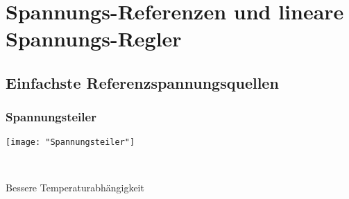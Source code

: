 \section{Spannungs-Referenzen und lineare Spannungs-Regler}
\subsection{Einfachste Referenzspannungsquellen}
\subsubsection{Spannungsteiler}
\begin{minipage}[t]{0.3\textwidth}
	\vspace{0pt}								%
	\texttt{[image: "Spannungsteiler"]}
\end{minipage}\hspace{0.05\textwidth}
\begin{minipage}[t]{0.3\textwidth}
	\vspace{0pt}
	\\
\end{minipage}
\begin{minipage}[t]{0.3\textwidth}
	\vspace{0pt}
	Bessere Temperaturabhängigkeit
\end{minipage}
\vspace{2mm}

